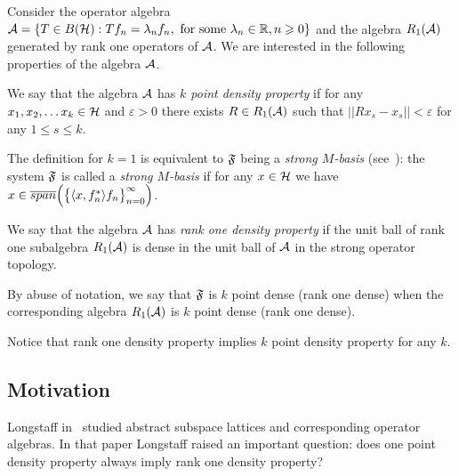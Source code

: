 \documentclass[12pt]{amsart}
\theoremstyle{case}
\begin{document}
    Consider the operator algebra $\cal{A} = \{T\in B(\cal{H}): Tf_n = \lambda_n f_n, \text{ for some } \lambda_n \in \mathbb{R}, n \geq 0\}$
      and the algebra $R_1(\cal{A})$ generated by rank one operators of $\cal{A}$.
    We are interested in the following properties of the algebra $\cal{A}$.
    \begin{definition}
      \label{kpd}
      We say that the algebra $\cal{A}$ has \emph{$k$ point density property} if for any $x_1, x_2,\dots x_k \in \cal{H}$ and $\varepsilon > 0$
        there exists $R\in R_1(\cal{A})$ such that $||Rx_s - x_s|| < \varepsilon$ for any $1 \leq s \leq k$.
    \end{definition}
    The definition for $k=1$ is equivalent to $\fsys$ being a \emph{strong $M$-basis} (see~\cite{katavolos}):
      the system $\fsys$ is called a \emph{strong $M$-basis} if for any $x\in\cal{H}$ we have $x \in \overline{span}\Big(\big\{\inner{x}{f^*_n}f_n\big\}_{n=0}^\infty\Big)$.
    \begin{definition}
      \label{r1d}
      We say that the algebra $\cal{A}$ has \emph{rank one density property} if the unit ball of rank one subalgebra $R_1(\cal{A})$
        is dense in the unit ball of $\cal{A}$ in the strong operator topology.
    \end{definition}
    By abuse of notation, we say that $\fsys$ is $k$ point dense (rank one dense)
      when the corresponding algebra $R_1(\cal{A})$ is $k$ point dense (rank one dense).

    Notice that rank one density property implies $k$ point density property for any $k$.

  \subsection{Motivation}
    Long\-staff in~\cite{longstaff} studied abstract subspace lattices and corresponding operator algebras.
    In that paper Longstaff raised an important question: does one point density property always imply rank one density property?
\end{document}

